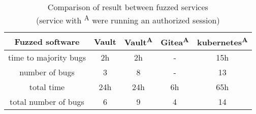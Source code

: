 \paragraph{}
\begin{table}[h]
\begin{center}
\begin{tabular}{|c|c c c c|}
\hline
Fuzzed software & Vault & Vault\textsuperscript{A} & Gitea\textsuperscript{A} & kubernetes\textsuperscript{A} \\
\hline
time to majority bugs & 2h  & 2h  & -  & 15h \\
number of bugs        & 3   & 8   & -  & 13  \\
\hline
total time            & 24h & 24h & 6h & 65h \\
total number of bugs  & 6   & 9   & 4  & 14  \\
\hline
\end{tabular}
\caption[Comparison of result between fuzzed services]{Comparison of result between fuzzed services\\(service with \textsuperscript{A} were running an authorized session)}
\label{table:fuzzed-software}
\end{center}
\end{table}


